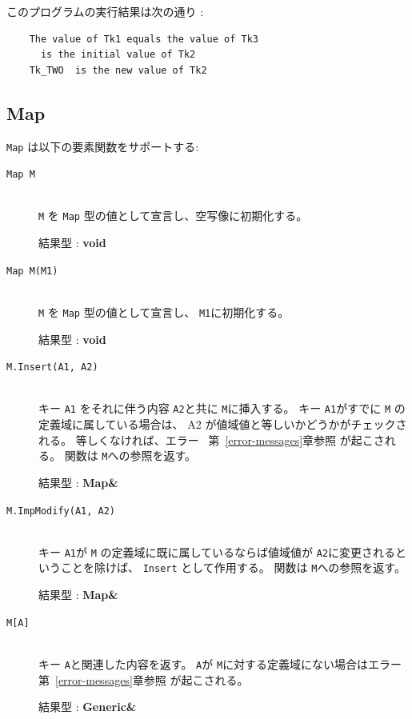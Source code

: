 \documentclass[\pformat,12pt]{jarticle}
\begin{document}
\noindent このプログラムの実行結果は次の通り :

\begin{verbatim}
    The value of Tk1 equals the value of Tk3
      is the initial value of Tk2
    Tk_TWO  is the new value of Tk2
\end{verbatim}




\subsection{Map}
{\tt Map} は以下の要素関数をサポートする:

\vspace{0.5cm}

\begin{description}
\item[{\tt Map M}] \mbox{}\\
     {\tt M} を {\tt Map} 型の値として宣言し、空写像に初期化する。

     結果型 : {\bf void}

\item[{\tt Map M(M1)}] \mbox{}\\
      {\tt M} を {\tt Map} 型の値として宣言し、 {\tt M1}に初期化する。

     結果型 : {\bf void}

\item[{\tt M.Insert(A1, A2)}] \mbox{}\\
キー {\tt A1} をそれに伴う内容 {\tt A2}と共に {\tt M}に挿入する。 
キー {\tt A1}がすでに {\tt M} の定義域に属している場合は、 A2 が値域値と等しいかどうかがチェックされる。
  等しくなければ、エラー \ 第~\ref{error-messages}章参照 が起こされる。 
  関数は {\tt M}への参照を返す。

     結果型 : {\bf Map\&}

\item[{\tt M.ImpModify(A1, A2)}] \mbox{}\\
     キー {\tt A1}が {\tt M} の定義域に既に属しているならば値域値が {\tt A2}に変更されるということを除けば、 {\tt Insert} として作用する。 
関数は {\tt M}への参照を返す。 

     結果型 : {\bf Map\&}
 
\item[{\tt M[A]}] \mbox{}\\
     キー {\tt A}と関連した内容を返す。
 {\tt A}が {\tt M}に対する定義域にない場合はエラー 第~\ref{error-messages}章参照 が起こされる。

     結果型 : {\bf Generic\&}


\end{description}
\end{document}
